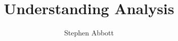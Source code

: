 \documentclass[letterpaper,11pt]{article}
\begin{document}
\date{}

\title{\Large \bf Understanding Analysis}

\author{
{\rm Stephen Abbott}
} %

\maketitle

{\normalsize 
}
\end{document}
